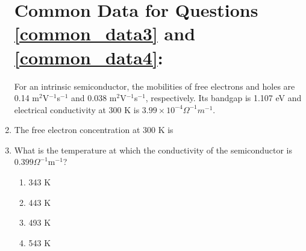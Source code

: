 \documentclass[journal]{IEEEtran}
\begin{document}
\begin{enumerate}
\section{\textbf{Common Data for Questions \ref{common_data3} and \ref{common_data4}:}}
For an intrinsic semiconductor, the mobilities of free electrons and holes are 0.14 m$^{2}$V$^{-1}$s$^{-1}$
 and 0.038 m$^{2}$V$^{-1}$s$^{-1}$, respectively. Its bandgap is 1.107 eV and electrical conductivity at 300 K is $3.99 \times 10^{-4} \Omega ^{-1}m^{-1}$.  \\
\item\label{common_data3} The free electron concentration  at 300 K is

\begin{enumerate}
\end{enumerate}

\item\label{common_data4} What is the temperature at which the conductivity of the semiconductor is $0.399 \Omega^{-1}\text{m}^{-1}$?
\begin{multicols}{4}
\begin{enumerate}
    \item 343 K
    \item 443 K
    \item 493 K
    \item 543 K
\end{enumerate}
\end{multicols}


\end{enumerate}
\end{document}
